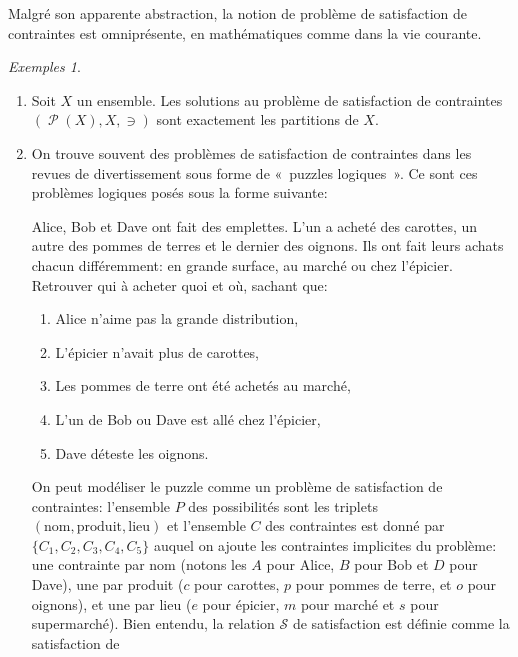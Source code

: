 \documentclass[french,a4paper]{article}
\theoremstyle{definition}
\theoremstyle{remark}
\newtheorem*{examples}{Exemples}
\DeclareMathOperator{\powersetoperator}{\mathcal P}
\newcommand{\powerset}[1]{\powersetoperator(#1)}
\begin{document}
Malgré son apparente abstraction, la notion de problème de
satisfaction de contraintes est omniprésente, en mathématiques comme
dans la vie courante.
\begin{examples}~
  \begin{enumerate}[label=(\arabic*)]
  \item Soit $X$ un ensemble. Les solutions au problème de
    satisfaction de contraintes $(\powerset X, X, \ni)$ sont
    exactement les partitions de $X$.
  \item On trouve souvent des problèmes de satisfaction de contraintes
    dans les revues de divertissement sous forme de «~puzzles
    logiques~». Ce sont ces problèmes logiques posés sous la forme
    suivante:
    \begin{center}
      \begin{minipage}{0.8\linewidth}
        Alice, Bob et Dave ont fait des emplettes. L'un a acheté des
        carottes, un autre des pommes de terres et le dernier des
        oignons. Ils ont fait leurs achats chacun différemment: en
        grande surface, au marché ou chez l'épicier. Retrouver qui à
        acheter quoi et où, sachant que:
        \begin{enumerate}[label=($C_{\arabic*}$)]
        \item Alice n'aime pas la grande distribution,
        \item L'épicier n'avait plus de carottes,
        \item Les pommes de terre ont été achetés au marché,
        \item L'un de Bob ou Dave est allé chez l'épicier,
        \item Dave déteste les oignons.
        \end{enumerate}
      \end{minipage}
    \end{center}
    On peut modéliser le puzzle comme un problème de satisfaction de
    contraintes: l'ensemble $P$ des possibilités sont les triplets
    $(\mathrm{nom},\mathrm{produit},\mathrm{lieu})$ et l'ensemble $C$
    des contraintes est donné par $\{C_1,C_2,C_3,C_4,C_5\}$ auquel on
    ajoute les contraintes implicites du problème: une contrainte par
    nom (notons les $A$ pour Alice, $B$ pour Bob et $D$ pour Dave),
    une par produit ($c$ pour carottes, $p$ pour pommes de terre, et
    $o$ pour oignons), et une par lieu ($e$ pour épicier, $m$ pour
    marché et $s$ pour supermarché). Bien entendu, la relation
    $\mathcal S$ de satisfaction est définie comme la satisfaction de

\end{enumerate}
\end{examples}
\end{document}
